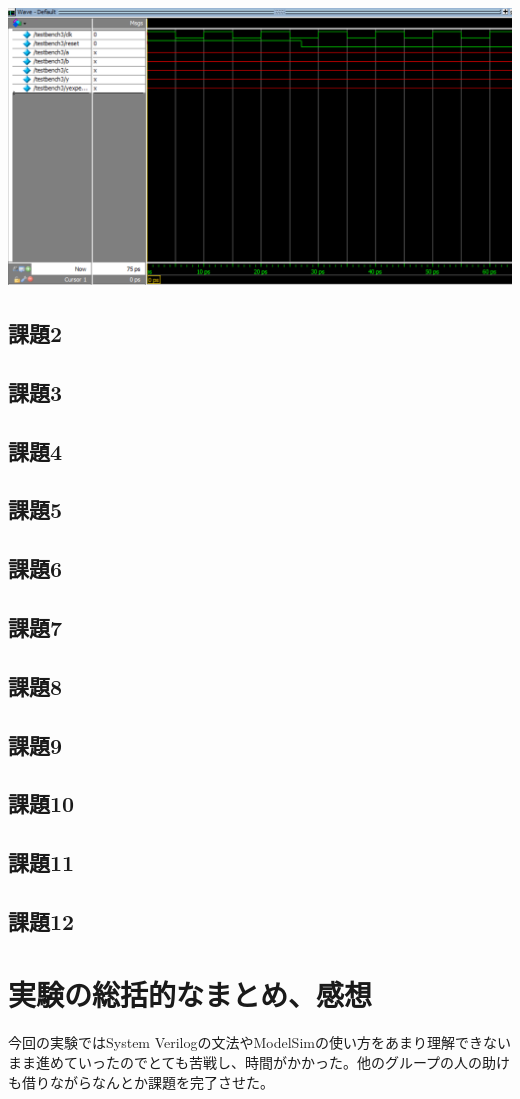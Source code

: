 \documentclass[a4paper]{jarticle}
\begin{document}
\begin{center}
	\includegraphics[width=15cm]{1-m-3.PNG}
\end{center}
\subsection{課題2}
\subsection{課題3}
\subsection{課題4}
\subsection{課題5}
\subsection{課題6}
\subsection{課題7}
\subsection{課題8}
\subsection{課題9}
\subsection{課題10}
\subsection{課題11}
\subsection{課題12}
\section{実験の総括的なまとめ、感想}
今回の実験ではSystem Verilogの文法やModelSimの使い方をあまり理解できないまま進めていったのでとても苦戦し、時間がかかった。他のグループの人の助けも借りながらなんとか課題を完了させた。
\end{document}
